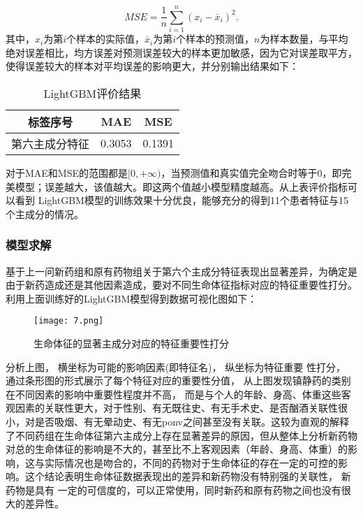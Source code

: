 \begin{equation}
    MSE=\frac{1}{n}\sum\limits_{i=1}^{n}{{{({{x}_{i}}-{{\overline{x}}_{i}})}^{2}}}.
\end{equation}
其中，${{x}_{i}}$为第$i$个样本的实际值，${{\overline{x}}_{i}}$为第$i$个样本的预测值，$n$为样本数量，与平均绝对误差相比，均方误差对预测误差较大的样本更加敏感，因为它对误差取平方，使得误差较大的样本对平均误差的影响更大，并分别输出结果如下：

\begin{table}[H]
    \centering  
    \caption{LightGBM评价结果}
    \begin{tabular}{c c c}  
    	\toprule[1.5pt]  
    	标签序号 & MAE & MSE \\  
    	\midrule[1pt]    
        第六主成分特征 & 0.3053	& 0.1391  \\
    	\toprule[1.5pt]  
    \end{tabular}  
\end{table} 

对于MAE和MSE的范围都是$[0,+\infty )$，当预测值和真实值完全吻合时等于0，即完美模型；误差越大，该值越大。即这两个值越小模型精度越高。从上表评价指标可以看到 LightGBM模型的训练效果十分优良，能够充分的得到11个患者特征与15个主成分的情况。



\subsubsection{模型求解}




基于上一问新药组和原有药物组关于第六个主成分特征表现出显著差异，为确定是由于新药造成还是其他因素造成，要对不同生命体征指标对应的特征重要性打分。利用上面训练好的LightGBM模型得到数据可视化图如下：
 
\begin{figure}[H] %
	\centering %
	\texttt{[image: 7.png]} 
	\caption{生命体征的显著主成分对应的特征重要性打分} 
	\label{Fig.main7} 
\end{figure} 

分析上图， 横坐标为可能的影响因素(即特征名)， 纵坐标为特征重要 性打分， 通过条形图的形式展示了每个特征对应的重要性分值， 从上图发现镇静药的类别在不同因素的影响中重要性程度并不高， 而是与个人的年龄、身高、体重这些客观因素的关联性更大，对于性别、有无既往史、有无手术史、是否酗酒关联性很小，对是否吸烟、有无晕动史、有无ponv之间甚至没有关联。这较为直观的解释了不同药组在生命体征第六主成分上存在显著差异的原因，但从整体上分析新药物对总的生命体征的影响是不大的，甚至比不上客观因素（年龄、身高、体重）的影响，这与实际情况也是吻合的，不同的药物对于生命体征的存在一定的可控的影响。这个结论表明生命体征数据表现出的差异和新药物没有特别强的关联性， 新药物是具有 一定的可信度的，可以正常使用，同时新药和原有药物之间也没有很大的差异性。